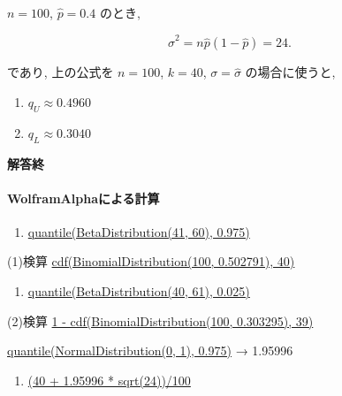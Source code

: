 \documentclass[10pt, a4paper,xelatex,ja=standard]{bxjsarticle}
\providecommand{\tightlist}{%
      \setlength{\itemsep}{0pt}\setlength{\parskip}{0pt}}
\begin{document}
\(n=100\), \(\hat{p}=0.4\) のとき,

\[
\hat{\sigma}^2 = n\hat{p}(1-\hat{p}) = 24.
\]

であり, 上の公式を \(n=100\), \(k=40\), \(\sigma=\hat\sigma\)
の場合に使うと,

\begin{enumerate}
\def\labelenumi{(\arabic{enumi})}
\setcounter{enumi}{2}
\item
  \(q_U \approx 0.4960\)
\item
  \(q_L \approx 0.3040\)
\end{enumerate}

\textbf{解答終}

    \hypertarget{wolframalphaux306bux3088ux308bux8a08ux7b97}{%
\paragraph{WolframAlphaによる計算}\label{wolframalphaux306bux3088ux308bux8a08ux7b97}}

\begin{enumerate}
\def\labelenumi{(\arabic{enumi})}
\tightlist
\item
  \href{https://www.wolframalpha.com/input?i=quantile\%28BetaDistribution\%2841\%2C+60\%29\%2C+0.975\%29}{quantile(BetaDistribution(41,
  60), 0.975)}
\end{enumerate}

(1)検算
\href{https://www.wolframalpha.com/input?i=cdf\%28BinomialDistribution\%28100\%2C+0.502791\%29\%2C+40\%29}{cdf(BinomialDistribution(100,
0.502791), 40)}

\begin{enumerate}
\def\labelenumi{(\arabic{enumi})}
\setcounter{enumi}{1}
\tightlist
\item
  \href{https://www.wolframalpha.com/input?i=quantile\%28BetaDistribution\%2840\%2C+61\%29\%2C+0.025\%29}{quantile(BetaDistribution(40,
  61), 0.025)}
\end{enumerate}

(2)検算
\href{https://www.wolframalpha.com/input?i=1+-+cdf\%28BinomialDistribution\%28100\%2C+0.303295\%29\%2C+39\%29}{1
- cdf(BinomialDistribution(100, 0.303295), 39)}

\href{https://www.wolframalpha.com/input?i=quantile\%28NormalDistribution\%280\%2C+1\%29\%2C+0.975\%29}{quantile(NormalDistribution(0,
1), 0.975)} → 1.95996

\begin{enumerate}
\def\labelenumi{(\arabic{enumi})}
\setcounter{enumi}{2}
\tightlist
\item
  \href{https://www.wolframalpha.com/input?i=\%2840+\%2B+1.95996+*+sqrt\%2824\%29\%29\%2F100}{(40
  + 1.95996 * sqrt(24))/100}
\end{enumerate}
\end{document}

